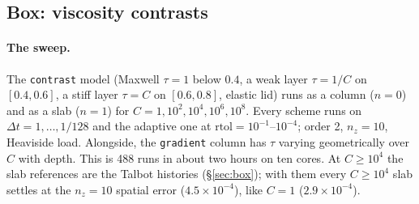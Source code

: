 \documentclass[11pt]{article}
\numberwithin{equation}{section}
\newcommand{\code}[1]{\texttt{#1}}
\begin{document}
\subsection{Box: viscosity contrasts}
\label{sec:box-contrast}

\paragraph{The sweep.}
The \code{contrast} model (Maxwell $\tau=1$ below $0.4$, a weak layer
$\tau=1/C$ on $[0.4,0.6]$, a stiff layer $\tau=C$ on $[0.6,0.8]$, elastic
lid) runs as a column ($n=0$) and as a slab ($n=1$) for
$C=1,10^2,10^4,10^6,10^8$. Every scheme runs on $\Delta t=1,\dots,1/128$
and the adaptive one at $\text{rtol}=10^{-1}$--$10^{-4}$; order 2,
$n_z=10$, Heaviside load. Alongside, the \code{gradient} column has
$\tau$ varying geometrically over $C$ with depth. This is 488 runs in
about two hours on ten cores. At $C\ge10^4$ the slab references are the
Talbot histories (\S\ref{sec:box}); with them every $C\ge10^4$ slab
settles at the $n_z=10$ spatial error ($4.5\times10^{-4}$), like $C=1$
($2.9\times10^{-4}$).
\end{document}
